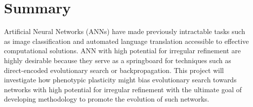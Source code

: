 \section{Summary}
Artificial Neural Networks (ANNs) have made previously intractable tasks such as image classification and automated language translation accessible to effective computational solutions.
ANN with high potential for irregular refinement are highly desirable because they serve as a springboard for techniques such as direct-encoded evolutionary search or backpropagation.
This project will investigate how phenotypic plasticity might bias evolutionary search towards networks with high potential for irregular refinement with the ultimate goal of developing methodology to promote the evolution of such networks.
